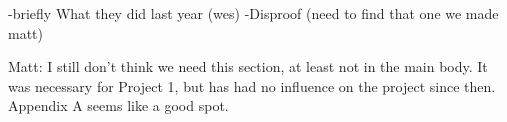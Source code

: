 \color{red}
-briefly What they did last year (wes) 
-Disproof (need to find that one we made matt)

Matt: I still don't think we need this section, at least not in the main body. It was necessary for Project 1, but has had no influence on the project since then. Appendix A seems like a good spot.
\color{black}